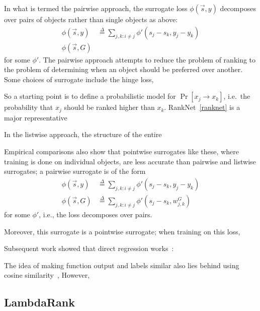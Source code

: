 In what is termed the pairwise approach, the surrogate loss
$\phi(\vec{s}, y)$ decomposes over pairs of objects rather than single objects
as above:
\begin{align*}
  \phi(\vec{s}, y)
  &\stackrel{\Delta}{=}
  \sum_{j,k : i \neq j} \phi'(s_j - s_k, y_j - y_k) \\
  \phi(\vec{s}, G)
\end{align*}
for some $\phi'$. The pairwise approach attempts to reduce the problem of
ranking to the problem of determining when an object should be preferred over
another. Some choices of surrogate include the hinge loss, 

So a starting point is to define
a probabilistic model for $\Pr[x_j \to x_k]$, i.e.\ the probability that $x_j$
should be ranked higher than $x_k$. RankNet~\ref{ranknet} is a major
representative 

In the listwise approach, the structure of the entire 

Empirical comparisons also show that pointwise
surrogates like these, where training is done on individual objects, are less
accurate than pairwise and listwise surrogates; a pairwise surrogate is of the
form
\begin{align*}
  \phi(\vec{s}, y)
  &\stackrel{\Delta}{=}
  \sum_{j,k : i \neq j} \phi'(s_j - s_k, y_j - y_k) \\
  \phi(\vec{s}, G)
  &\stackrel{\Delta}{=}
  \sum_{j,k : i \neq j} \phi'(s_j - s_k, w_{j,k}^G) 
\end{align*}
for some $\phi'$, i.e., the loss decomposes over pairs.

Moreover, this surrogate is a pointwise surrogate;
when training on this loss, 



Subsequent work showed that
direct regression works~\cite{ndcg-consistency}: 

The idea of making function output and labels similar
also lies behind using cosine similarity~\cite{rank-cosine}, 
However, 


\subsection{LambdaRank}

